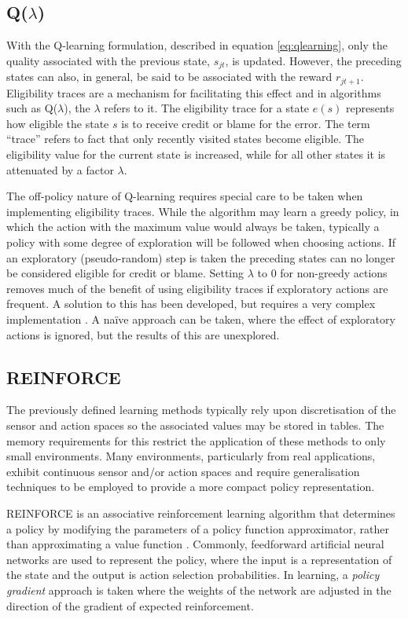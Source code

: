 \subsection{Q($\lambda$)}
\label{sec:qlambda}
With the Q-learning formulation, described in equation \ref{eq:qlearning}, only
the quality associated with the previous state, $s_{jt}$, is updated.  However,
the preceding states can also, in general, be said to be associated with the
reward $r_{jt+1}$.  Eligibility traces are a mechanism for facilitating this
effect and in algorithms such as Q($\lambda$), the $\lambda$ refers to it. The
eligibility trace for a state $e(s)$ represents how eligible the state $s$ is
to receive credit or blame for the error.  The term ``trace'' refers to fact
that only recently visited states become eligible.  The eligibility value for
the current state is increased, while for all other states it is attenuated by
a factor $\lambda$.

The off-policy nature of Q-learning requires special care to be taken when
implementing eligibility traces.  While the algorithm may learn a greedy
policy, in which the action with the maximum value would always be taken,
typically a policy with some degree of exploration will be followed when
choosing actions.  If an exploratory (pseudo-random) step is taken the
preceding states can no longer be considered eligible for credit or blame.
Setting $\lambda$ to $0$ for non-greedy actions removes much of the benefit of
using eligibility traces if exploratory actions are frequent.  A solution to
this has been developed, but requires a very complex implementation
\cite{peng:1996}.  A na\"ive approach can be taken, where the effect of
exploratory actions is ignored, but the results of this are unexplored.

\subsection{REINFORCE}
\label{sec:reinforce}
The previously defined learning methods typically rely upon discretisation of
the sensor and action spaces so the associated values may be stored in tables.
The memory requirements for this restrict the application of these methods to
only small environments.  Many environments, particularly from real
applications, exhibit continuous sensor and/or action spaces and require
generalisation techniques to be employed to provide a more compact policy
representation.

REINFORCE is an associative reinforcement learning algorithm that determines
a policy by modifying the parameters of a policy function approximator, rather
than approximating a value function \cite{williams:reinforce}.  Commonly,
feedforward artificial neural networks are used to represent the policy, where
the input is a representation of the state and the output is action selection
probabilities.  In learning, a \textit{policy gradient} approach is taken where
the weights of the network are adjusted in the direction of the gradient of
expected reinforcement.

